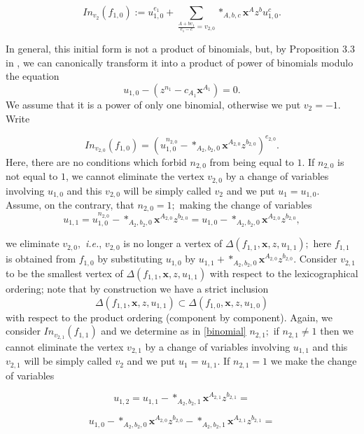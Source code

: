 \documentclass[11pt, a4paper]{amsart}
\numberwithin{equation}{section}
\theoremstyle{plain}
\theoremstyle{definition}
\theoremstyle{remark}
\newcommand{\0}{{\boldsymbol 0}}
\newcommand{\x}{{\boldsymbol x}}
\begin{document}
\begin{equation}
    In_{v_2}(f_{1,0}):=u_{1,0}^{e_1}+\sum_{\frac{A+bv_{1}}{e_1-c}=v_{2,0}} *_{A,b,c}\x^Az^bu_{1,0}^c.
\end{equation} 

In general, this initial form is not a product of binomials, but, by Proposition 3.3 in \cite{MS}, we can canonically transform it into a  product of power of binomials modulo the equation $$u_{1,0}-(z^{n_1}-c_{A_1}\x^{A_1})=0.$$ We assume that it is a power of only one binomial, otherwise we put $v_2=-1.$ Write  

\begin{equation}\label{binomial}
 In_{v_{2,0}}(f_{1,0})=(u_{1,0}^{n_{2,0}}-*_{A_2,b_2,0}\x^{A_{2,0}}z^{b_{2,0}})^{e_{2,0}}.
 \end{equation}
 Here, there are no conditions which forbid $n_{2,0}$ from being equal to $1.$ If $n_{2,0}$ is not equal to $1$, we cannot eliminate the vertex $v_{2,0}$ by a change of variables involving $u_{1,0}$ and this $v_{2,0}$ will be simply called $v_2$ and we put $u_1=u_{1,0}.$ Assume, on the contrary, that $n_{2,0}=1;$ making the change of variables
  $$ u_{1,1}=u_{1,0}^{n_{2,0}}-*_{A_2,b_2,0}\x^{A_{2,0}}z^{b_{2,0}}=u_{1,0}-*_{A_2,b_2,0}\x^{A_{2,0}}z^{b_{2,0}},$$ 
  
 we eliminate $v_{2,0},$ \textit{i.e.}, $v_{2,0}$ is no longer a vertex of $\Delta(f_{1,1},\x,z,u_{1,1});$ here $f_{1,1}$ is obtained from $f_{1,0}$ by substituting      
$u_{1,0}$ by $u_{1,1}+*_{A_2,b_2,0}\x^{A_{2,0}}z^{b_{2,0}}.$ Consider $v_{2,1}$ to be the smallest vertex of $\Delta(f_{1,1},\x,z,u_{1,1})$ with respect to the lexicographical ordering; note that by construction we have a strict inclusion 
\begin{equation}\label{inclusion}
\Delta(f_{1,1},\x,z,u_{1,1})\subset \Delta(f_{1,0},\x,z,u_{1,0})
\end{equation} 
with respect to the product ordering (component by component). Again, we consider 
$In_{v_{2,1}}(f_{1,1})$ and we determine as in \eqref{binomial} $n_{2,1};$
if $n_{2,1} \not= 1$ then we cannot eliminate the vertex $v_{2,1}$ by a change of variables involving $u_{1,1}$ and this $v_{2,1}$ will be simply called $v_2$ and we put $u_1=u_{1,1}.$ If $n_{2,1}=1$ we make the change of variables  

$$u_{1,2}=u_{1,1}-*_{A_2,b_2,1}\x^{A_{2,1}}z^{b_{2,1}}=$$

$$u_{1,0}-*_{A_2,b_2,0}\x^{A_{2,0}}z^{b_{2,0}}-*_{A_2,b_2,1}\x^{A_{2,1}}z^{b_{2,1}}=$$
\end{document}

